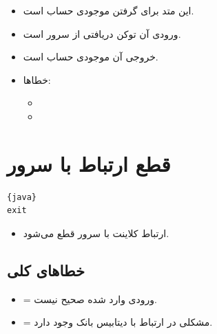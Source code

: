 \documentclass[]{article}
\begin{document}
\begin{itemize}
\item
این متد برای گرفتن موجودی حساب است.
\item
\textcolor{CustomColor}{ورودی} آن توکن دریافتی از سرور است.
\item
\textcolor{CustomColor}{خروجی} آن موجودی حساب است.
\item
\textcolor{CustomColor}{خطاها}:
\begin{itemize}
\item
{}

\item
{}


\end{itemize}

\end{itemize}


\section*{{\titr قطع ارتباط با سرور}}

\begin{latin}

\begin{lstlisting}{java}
exit
\end{lstlisting}

\end{latin}

\begin{itemize}
\item
ارتباط کلاینت با سرور قطع می‌شود.
\end{itemize}

\subsection*{{\titr خطاهای کلی}}

\begin{itemize}

\item
{} = ورودی وارد شده صحیح نیست.

\item
{} = مشکلی در ارتباط با دیتابیس بانک وجود دارد.



\end{itemize}
\end{document}
